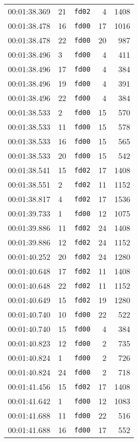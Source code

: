 \documentclass{article}
\begin{document}
\begin{longtable}{lllrr}
00:01:38.369 & 21 & \texttt{fd02} & 4 & 1408 \\
00:01:38.478 & 16 & \texttt{fd00} & 17 & 1016 \\
00:01:38.478 & 22 & \texttt{fd00} & 20 & 987 \\
00:01:38.496 & 3 & \texttt{fd00} & 4 & 411 \\
00:01:38.496 & 17 & \texttt{fd00} & 4 & 384 \\
00:01:38.496 & 19 & \texttt{fd00} & 4 & 391 \\
00:01:38.496 & 22 & \texttt{fd00} & 4 & 384 \\
00:01:38.533 & 2 & \texttt{fd00} & 15 & 570 \\
00:01:38.533 & 11 & \texttt{fd00} & 15 & 578 \\
00:01:38.533 & 16 & \texttt{fd00} & 15 & 565 \\
00:01:38.533 & 20 & \texttt{fd00} & 15 & 542 \\
00:01:38.541 & 15 & \texttt{fd02} & 17 & 1408 \\
00:01:38.551 & 2 & \texttt{fd02} & 11 & 1152 \\
00:01:38.817 & 4 & \texttt{fd02} & 17 & 1536 \\
00:01:39.733 & 1 & \texttt{fd00} & 12 & 1075 \\
00:01:39.886 & 11 & \texttt{fd02} & 24 & 1408 \\
00:01:39.886 & 12 & \texttt{fd02} & 24 & 1152 \\
00:01:40.252 & 20 & \texttt{fd02} & 24 & 1280 \\
00:01:40.648 & 17 & \texttt{fd02} & 11 & 1408 \\
00:01:40.648 & 22 & \texttt{fd02} & 11 & 1152 \\
00:01:40.649 & 15 & \texttt{fd02} & 19 & 1280 \\
00:01:40.740 & 10 & \texttt{fd00} & 22 & 522 \\
00:01:40.740 & 15 & \texttt{fd00} & 4 & 384 \\
00:01:40.823 & 12 & \texttt{fd00} & 2 & 735 \\
00:01:40.824 & 1 & \texttt{fd00} & 2 & 726 \\
00:01:40.824 & 24 & \texttt{fd00} & 2 & 718 \\
00:01:41.456 & 15 & \texttt{fd02} & 17 & 1408 \\
00:01:41.642 & 1 & \texttt{fd00} & 12 & 1083 \\
00:01:41.688 & 11 & \texttt{fd00} & 22 & 516 \\
00:01:41.688 & 16 & \texttt{fd00} & 17 & 552 \\

\end{longtable}
\end{document}
